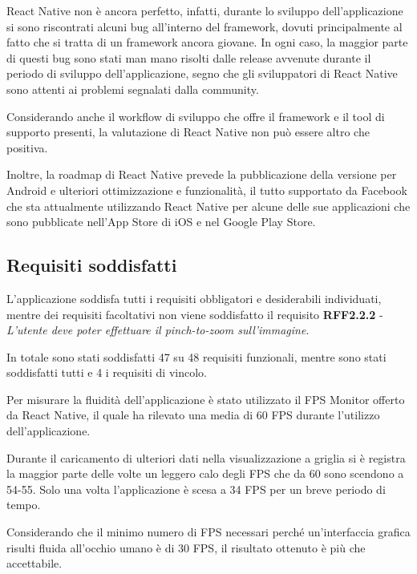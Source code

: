 React Native non è ancora perfetto, infatti, durante lo sviluppo dell'applicazione si sono riscontrati alcuni bug all'interno del framework, dovuti principalmente al fatto che si tratta di un framework ancora giovane.
In ogni caso, la maggior parte di questi bug sono stati man mano risolti dalle release avvenute durante il periodo di sviluppo dell'applicazione, segno che gli sviluppatori di React Native sono attenti ai problemi segnalati dalla community.

Considerando anche il workflow di sviluppo che offre il framework e il tool di supporto presenti, la valutazione di React Native non può essere altro che positiva.

Inoltre, la roadmap di React Native prevede la pubblicazione della versione per Android e ulteriori ottimizzazione e funzionalità, il tutto supportato da Facebook che sta attualmente utilizzando React Native per alcune delle sue applicazioni che sono pubblicate nell'App Store di iOS e nel Google Play Store.


\subsection{Requisiti soddisfatti}

L'applicazione soddisfa tutti i requisiti obbligatori e desiderabili individuati, mentre dei requisiti facoltativi non viene soddisfatto il requisito
\textbf{RFF2.2.2} - \textit{L'utente deve poter effettuare il pinch-to-zoom sull'immagine}.

In totale sono stati soddisfatti 47 su 48 requisiti funzionali, mentre sono stati soddisfatti tutti e 4 i requisiti di vincolo.

Per misurare la fluidità dell'applicazione è stato utilizzato il FPS Monitor offerto da React Native, il quale ha rilevato una media di 60 FPS durante l'utilizzo dell'applicazione.

Durante il caricamento di ulteriori dati nella visualizzazione a griglia si è registra la maggior parte delle volte un leggero calo degli FPS che da 60 sono scendono a 54-55.
Solo una volta l'applicazione è scesa a 34 FPS per un breve periodo di tempo.

Considerando che il minimo numero di FPS necessari perché un'interfaccia grafica risulti fluida all'occhio umano è di 30 FPS, il risultato ottenuto è più che accettabile.

